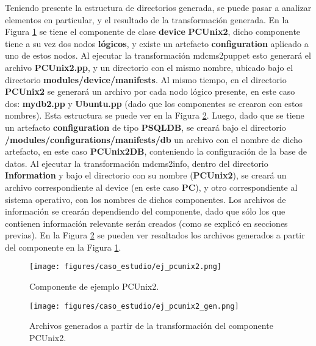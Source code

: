 Teniendo presente la estructura de directorios generada, se puede pasar a analizar elementos en particular, y el resultado de la transformación generada. En la Figura \ref{fig:caso_estudio:ejemplo_pcunix2} se tiene el componente de clase \textbf{device} \textbf{PCUnix2}, dicho componente tiene a su vez dos nodos \textbf{lógicos}, y existe un artefacto \textbf{configuration} aplicado a uno de estos nodos. Al ejecutar la transformación mdcms2puppet esto generará el archivo \textbf{PCUnix2.pp}, y un directorio con el mismo nombre, ubicado bajo el directorio \textbf{modules/device/manifests}. Al mismo tiempo, en el directorio \textbf{PCUnix2} se generará un archivo por cada nodo lógico presente, en este caso dos: \textbf{mydb2.pp} y \textbf{Ubuntu.pp} (dado que los componentes se crearon con estos nombres). Esta estructura se puede ver en la Figura \ref{fig:caso_estudio:ejemplo_pcunix2_gen}.
Luego, dado que se tiene un artefacto \textbf{configuration} de tipo \textbf{PSQLDB}, se creará bajo el directorio \textbf{/modules/configurations/manifests/db} un archivo con el nombre de dicho artefacto, en este caso \textbf{PCUnix2DB}, conteniendo la configuración de la base de datos.
Al ejecutar la transformación mdcms2info, dentro del directorio \textbf{Information} y bajo el directorio con su nombre (\textbf{PCUnix2}), se creará un archivo correspondiente al device (en este caso \textbf{PC}), y otro correspondiente al sistema operativo, con los nombres de dichos componentes. Los archivos de información se crearán dependiendo del componente, dado que sólo los que contienen información relevante serán creados (como se explicó en secciones previas).
En la Figura \ref{fig:caso_estudio:ejemplo_pcunix2_gen} se pueden ver resaltados los archivos generados a partir del componente en la Figura \ref{fig:caso_estudio:ejemplo_pcunix2}.

\begin{figure}[htbp]
    \centering
    \texttt{[image: figures/caso\_estudio/ej\_pcunix2.png]}
    \caption{Componente de ejemplo PCUnix2.}
    \label{fig:caso_estudio:ejemplo_pcunix2}
\end{figure}

\begin{figure}[htbp]
    \centering
    \texttt{[image: figures/caso\_estudio/ej\_pcunix2\_gen.png]}
    \caption{Archivos generados a partir de la transformación del componente PCUnix2.}
    \label{fig:caso_estudio:ejemplo_pcunix2_gen}
\end{figure}

